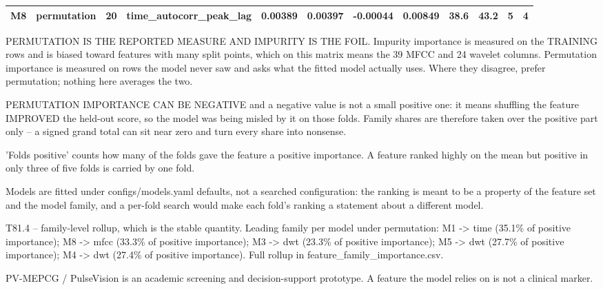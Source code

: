 \begin{table}[htbp]
\begin{tabular}{lrrrrrrrrrrr}
    M8 & permutation & 20 & time\_autocorr\_peak\_lag & 0.00389 & 0.00397 & -0.00044 & 0.00849 & 38.6 & 43.2 & 5 & 4 \\
    \bottomrule
  \end{tabular}
  \par\footnotesize PERMUTATION IS THE REPORTED MEASURE AND IMPURITY IS THE FOIL. Impurity importance is measured on the TRAINING rows and is biased toward features with many split points, which on this matrix means the 39 MFCC and 24 wavelet columns. Permutation importance is measured on rows the model never saw and asks what the fitted model actually uses. Where they disagree, prefer permutation; nothing here averages the two.
  \par\footnotesize PERMUTATION IMPORTANCE CAN BE NEGATIVE and a negative value is not a small positive one: it means shuffling the feature IMPROVED the held-out score, so the model was being misled by it on those folds. Family shares are therefore taken over the positive part only -- a signed grand total can sit near zero and turn every share into nonsense.
  \par\footnotesize 'Folds positive' counts how many of the folds gave the feature a positive importance. A feature ranked highly on the mean but positive in only three of five folds is carried by one fold.
  \par\footnotesize Models are fitted under configs/models.yaml defaults, not a searched configuration: the ranking is meant to be a property of the feature set and the model family, and a per-fold search would make each fold's ranking a statement about a different model.
  \par\footnotesize T81.4 -- family-level rollup, which is the stable quantity. Leading family per model under permutation: M1 -> time (35.1\% of positive importance); M8 -> mfcc (33.3\% of positive importance); M3 -> dwt (23.3\% of positive importance); M5 -> dwt (27.7\% of positive importance); M4 -> dwt (27.4\% of positive importance). Full rollup in feature\_family\_importance.csv.
  \par\footnotesize PV-MEPCG / PulseVision is an academic screening and decision-support prototype. A feature the model relies on is not a clinical marker.
\end{table}
